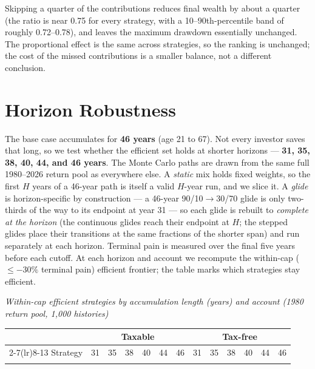 \documentclass[11pt]{article}
\begin{document}
Skipping a quarter of the contributions reduces final wealth by about a quarter (the ratio is near 0.75
for every strategy, with a 10--90th-percentile band of roughly 0.72--0.78), and leaves the maximum
drawdown essentially unchanged. The proportional effect is the same across strategies, so the ranking
is unchanged; the cost of the missed contributions is a smaller balance, not a different conclusion.

\section{Horizon Robustness}\label{sec:horizon}

The base case accumulates for \textbf{46 years} (age 21 to 67). Not every investor saves that long, so
we test whether the efficient set holds at shorter horizons --- \textbf{31, 35, 38, 40, 44, and 46
years}. The Monte Carlo paths are drawn from the same full 1980--2026 return pool as everywhere else. A
\emph{static} mix holds fixed weights, so the first $H$ years of a 46-year path is itself a valid
$H$-year run, and we slice it. A \emph{glide} is horizon-specific by construction --- a 46-year
90/10$\to$30/70 glide is only two-thirds of the way to its endpoint at year 31 --- so each glide is
rebuilt to \emph{complete at the horizon} (the continuous glides reach their endpoint at $H$; the
stepped glides place their transitions at the same fractions of the shorter span) and run separately at
each horizon. Terminal pain is measured over the final five years before each cutoff. At each horizon
and account we recompute the within-cap ($\leq -30\%$ terminal pain) efficient frontier; the table marks
which strategies stay efficient.

{\footnotesize
\begin{center}
\textit{Within-cap efficient strategies by accumulation length (years) and account (1980 return pool, 1{,}000 histories)}\\[2pt]
\begin{tabular}{@{}lcccccccccccc@{}}
\toprule
 & \multicolumn{6}{c}{Taxable} & \multicolumn{6}{c}{Tax-free} \\
\cmidrule(lr){2-7}\cmidrule(lr){8-13}
Strategy & 31 & 35 & 38 & 40 & 44 & 46 & 31 & 35 & 38 & 40 & 44 & 46 \\
\midrule
\\
\bottomrule
\end{tabular}
\end{center}
}
\end{document}

